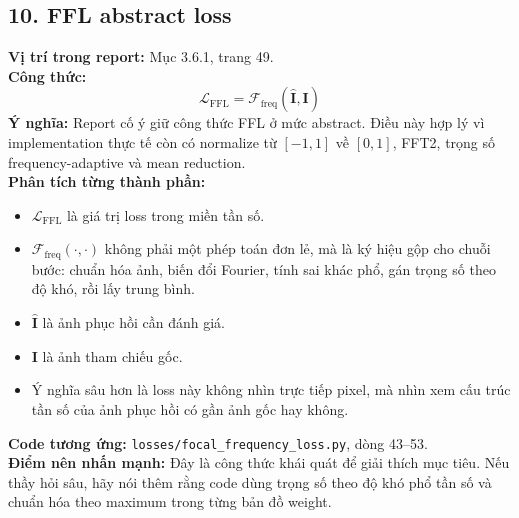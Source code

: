 \documentclass[12pt,a4paper]{article}
\begin{document}
\subsection*{10. FFL abstract loss}
\textbf{Vị trí trong report:} Mục 3.6.1, trang 49.\\
\textbf{Công thức:}
\[
\mathcal{L}_{\mathrm{FFL}} = \mathcal{F}_{\mathrm{freq}}(\hat{\mathbf{I}}, \mathbf{I})
\]
\textbf{Ý nghĩa:} Report cố ý giữ công thức FFL ở mức abstract. Điều này hợp lý vì implementation thực tế còn có normalize từ $[-1,1]$ về $[0,1]$, FFT2, trọng số frequency-adaptive và mean reduction.\\
\textbf{Phân tích từng thành phần:}
\begin{itemize}[leftmargin=1.5em]
\item $\mathcal{L}_{\mathrm{FFL}}$ là giá trị loss trong miền tần số.
\item $\mathcal{F}_{\mathrm{freq}}(\cdot,\cdot)$ không phải một phép toán đơn lẻ, mà là ký hiệu gộp cho chuỗi bước: chuẩn hóa ảnh, biến đổi Fourier, tính sai khác phổ, gán trọng số theo độ khó, rồi lấy trung bình.
\item $\hat{\mathbf{I}}$ là ảnh phục hồi cần đánh giá.
\item $\mathbf{I}$ là ảnh tham chiếu gốc.
\item Ý nghĩa sâu hơn là loss này không nhìn trực tiếp pixel, mà nhìn xem cấu trúc tần số của ảnh phục hồi có gần ảnh gốc hay không.
\end{itemize}
\textbf{Code tương ứng:} \texttt{losses/focal\_frequency\_loss.py}, dòng 43--53.\\
\textbf{Điểm nên nhấn mạnh:} Đây là công thức khái quát để giải thích mục tiêu. Nếu thầy hỏi sâu, hãy nói thêm rằng code dùng trọng số theo độ khó phổ tần số và chuẩn hóa theo maximum trong từng bản đồ weight.
\end{document}
